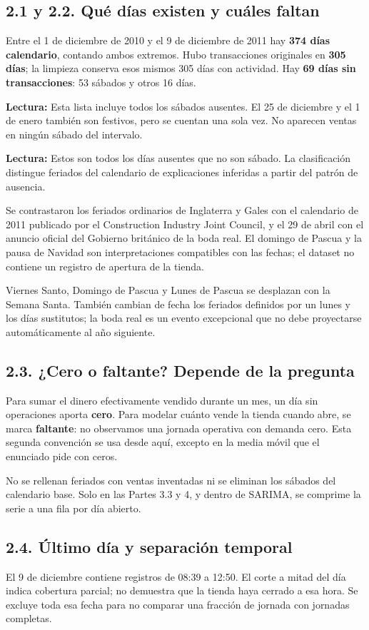 \documentclass[11pt,letterpaper]{article}
\newcommand{\tabla}[2]{\begin{center}\small\textbf{Lectura:} #2\end{center}}
\begin{document}
\subsection{2.1 y 2.2. Qué días existen y cuáles faltan}
Entre el 1 de diciembre de 2010 y el 9 de diciembre de 2011 hay \textbf{374 días calendario}, contando ambos extremos. Hubo transacciones originales en \textbf{305 días}; la limpieza conserva esos mismos 305 días con actividad. Hay \textbf{69 días sin transacciones}: 53 sábados y otros 16 días.

\tabla{sabados}{Esta lista incluye todos los sábados ausentes. El 25 de diciembre y el 1 de enero también son festivos, pero se cuentan una sola vez. No aparecen ventas en ningún sábado del intervalo.}
\tabla{otros_cierres}{Estos son todos los días ausentes que no son sábado. La clasificación distingue feriados del calendario de explicaciones inferidas a partir del patrón de ausencia.}

Se contrastaron los feriados ordinarios de Inglaterra y Gales con el calendario de 2011 publicado por el Construction Industry Joint Council, y el 29 de abril con el anuncio oficial del Gobierno británico de la boda real. El domingo de Pascua y la pausa de Navidad son interpretaciones compatibles con las fechas; el dataset no contiene un registro de apertura de la tienda.

Viernes Santo, Domingo de Pascua y Lunes de Pascua se desplazan con la Semana Santa. También cambian de fecha los feriados definidos por un lunes y los días sustitutos; la boda real es un evento excepcional que no debe proyectarse automáticamente al año siguiente.

\subsection{2.3. ¿Cero o faltante? Depende de la pregunta}
Para sumar el dinero efectivamente vendido durante un mes, un día sin operaciones aporta \textbf{cero}. Para modelar cuánto vende la tienda cuando abre, se marca \textbf{faltante}: no observamos una jornada operativa con demanda cero. Esta segunda convención se usa desde aquí, excepto en la media móvil que el enunciado pide con ceros.

No se rellenan feriados con ventas inventadas ni se eliminan los sábados del calendario base. Solo en las Partes 3.3 y 4, y dentro de SARIMA, se comprime la serie a una fila por día abierto.

\subsection{2.4. Último día y separación temporal}
El 9 de diciembre contiene registros de 08:39 a 12:50. El corte a mitad del día indica cobertura parcial; no demuestra que la tienda haya cerrado a esa hora. Se excluye toda esa fecha para no comparar una fracción de jornada con jornadas completas.
\end{document}
